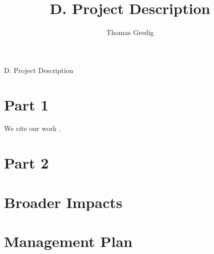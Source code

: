 \documentclass{proposal}
\begin{document}

\author{Thomas Gredig}
\title{D. Project Description}
\renewcommand{\thepage} {D--\arabic{page}}
\renewcommand\thesection{\alph{section}.}
\renewcommand\thesubsection{\alph{section}.\arabic{subsection}} %


  \begin{center}\leavevmode
    \normalfont
    { D. Project Description }%
  \end{center}%




\section{Part 1}

\noindent
We cite our work \cite{Nguyen_Synthesis_2020,Bartolome_Molecular_2015,Bartolome_Quadrupolar_2015,Ekstrand_Tunable_2017,Gredig_Height-Height_2013,Tran_Low-temperature_2018,Gredig_Asymmetric_2008}.

\section{Part 2}

\noindent
\lipsum[2]

\section{Broader Impacts}

\lipsum[3]

\section{ Management Plan }

\lipsum[4]


\clearpage
\setcounter{page}{1}
\renewcommand{\thepage} {E--\arabic{page}}



\end{document}
